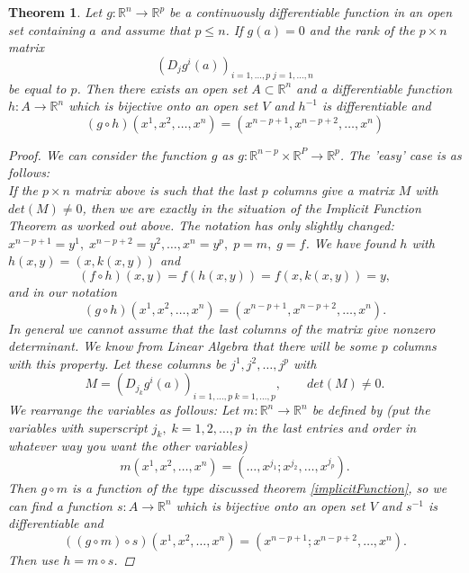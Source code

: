 \documentclass[12pt]{article}
\def\RR{\mathbb{R}}
\newtheorem{theorem}{Theorem}[section]
\begin{document}
\begin{theorem}\label{imp2}
Let $g : \RR^n \rightarrow \RR^p$ be a continuously differentiable function in an open set containing $a$ and assume that $p \leq n$. If $g(a) = 0$ and the rank of the $p \times n$ matrix
\[(D_jg^i(a))_{i=1,\dots,p \; j=1,\dots, n} \]
be equal to $p$. Then there exists an open set $A \subset \RR^n$ and a differentiable function $h : A \rightarrow \RR^n$ which is bijective onto an open set $V$ and $h^{-1}$ is differentiable and
\[(g \circ h)(x^1, x^2, \dots,x^n) = (x^{n-p+1}, x^{n - p+2}, \dots,x^n) \]
\begin{proof}
We can consider the function $g$ as $g : \RR^{n-p} \times \RR^P \rightarrow \RR^p$. The 'easy' case is as follows:\\
If the $p\times n$ matrix above is such that the last $p$ columns give a matrix $M$ with $det(M) \neq
0$, then we are exactly in the situation of the Implicit Function Theorem as worked out
above. The notation has only slightly changed: $x^{n-p+1} = y^1,\; x^{n-p+2} = y^2, \dots,x^n = y^p, \;
p = m,\; g = f$. We have found $h$ with $h(x, y) = (x, k(x, y))$ and 
\[(f \circ h)(x, y) = f(h(x, y)) = f(x, k(x, y)) = y,\]
and in our notation
\[(g \circ h)(x^1, x^2, \dots,  x^n) = (x^{n-p+1}, x^{n-p+2}, \dots, x^n).\]
In general we cannot assume that the last columns of the matrix give nonzero determinant. We know from Linear Algebra that there will be some $p$ columns with this property. Let these columns be $j^1, j^2, \dots, j^p$ with
\[M =(D_{j_k}g^i(a))_{i=1,\dots,p \; k=1,\dots ,p}, \qquad det(M) \neq 0.\]
We rearrange the variables as follows: Let $m : \RR^n \rightarrow \RR^n$ be defined by (put the variables
with superscript $j_k,\; k = 1, 2,\dots, p$ in the last entries and order in whatever way you want
the other variables)
\[m(x^1, x^2, \dots ,x^n) = (\dots, x^{j_1} ; x^{j_2},\dots, x^{j_p}).\]
Then $g \circ m$ is a function of the type discussed theorem \ref{implicitFunction}, so we can find a function $s : A \rightarrow \RR^n$
which is bijective onto an open set $V$ and $s^{-1}$ is differentiable and
\[ ((g \circ m) \circ s)(x^1, x^2, \dots, x^n) = (x^{n-p+1}; x^{n-p+2} , \dots,  x^n).\]
Then use $h = m \circ s$.
\end{proof}
\end{theorem}
\end{document}
